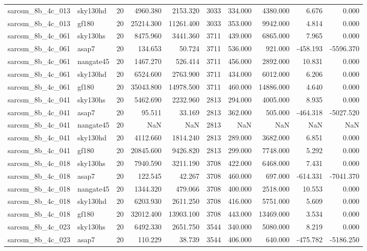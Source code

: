 \begin{longtable}{llrrrrrrrr}
sarcsm\_8b\_4c\_013 & sky130hd & 20 & 4960.380 & 2153.320 & 3033 & 334.000 & 4380.000 & 6.676 & 0.000 \\
sarcsm\_8b\_4c\_013 & gf180 & 20 & 25214.300 & 11261.400 & 3033 & 353.000 & 9942.000 & 4.814 & 0.000 \\
sarcsm\_8b\_4c\_061 & sky130hs & 20 & 8475.960 & 3441.360 & 3711 & 439.000 & 6865.000 & 7.965 & 0.000 \\
sarcsm\_8b\_4c\_061 & asap7 & 20 & 134.653 & 50.724 & 3711 & 536.000 & 921.000 & -458.193 & -5596.370 \\
sarcsm\_8b\_4c\_061 & nangate45 & 20 & 1467.270 & 526.414 & 3711 & 456.000 & 2892.000 & 10.831 & 0.000 \\
sarcsm\_8b\_4c\_061 & sky130hd & 20 & 6524.600 & 2763.900 & 3711 & 434.000 & 6012.000 & 6.206 & 0.000 \\
sarcsm\_8b\_4c\_061 & gf180 & 20 & 35043.800 & 14978.500 & 3711 & 460.000 & 14886.000 & 4.640 & 0.000 \\
sarcsm\_8b\_4c\_041 & sky130hs & 20 & 5462.690 & 2232.960 & 2813 & 294.000 & 4005.000 & 8.935 & 0.000 \\
sarcsm\_8b\_4c\_041 & asap7 & 20 & 95.511 & 33.169 & 2813 & 362.000 & 505.000 & -464.318 & -5027.520 \\
sarcsm\_8b\_4c\_041 & nangate45 & 20 & NaN & NaN & 2813 & NaN & NaN & NaN & NaN \\
sarcsm\_8b\_4c\_041 & sky130hd & 20 & 4112.660 & 1814.240 & 2813 & 289.000 & 3682.000 & 6.851 & 0.000 \\
sarcsm\_8b\_4c\_041 & gf180 & 20 & 20845.600 & 9426.820 & 2813 & 299.000 & 7748.000 & 5.292 & 0.000 \\
sarcsm\_8b\_4c\_018 & sky130hs & 20 & 7940.590 & 3211.190 & 3708 & 422.000 & 6468.000 & 7.431 & 0.000 \\
sarcsm\_8b\_4c\_018 & asap7 & 20 & 122.545 & 42.267 & 3708 & 460.000 & 697.000 & -614.331 & -7041.370 \\
sarcsm\_8b\_4c\_018 & nangate45 & 20 & 1344.320 & 479.066 & 3708 & 400.000 & 2518.000 & 10.553 & 0.000 \\
sarcsm\_8b\_4c\_018 & sky130hd & 20 & 6203.930 & 2611.250 & 3708 & 416.000 & 5751.000 & 5.609 & 0.000 \\
sarcsm\_8b\_4c\_018 & gf180 & 20 & 32012.400 & 13903.100 & 3708 & 443.000 & 13469.000 & 3.534 & 0.000 \\
sarcsm\_8b\_4c\_023 & sky130hs & 20 & 6492.330 & 2651.750 & 3544 & 340.000 & 5080.000 & 8.219 & 0.000 \\
sarcsm\_8b\_4c\_023 & asap7 & 20 & 110.229 & 38.739 & 3544 & 406.000 & 640.000 & -475.782 & -5186.250 \\

\end{longtable}
